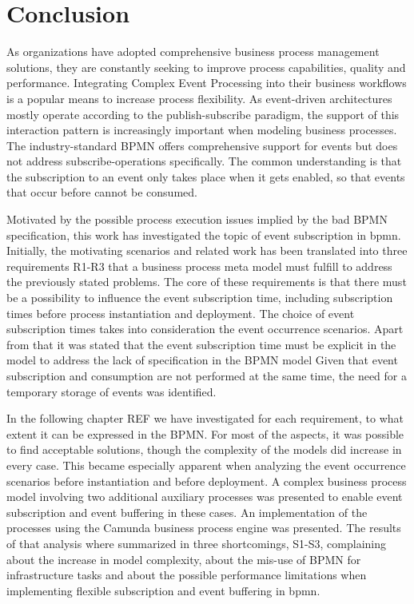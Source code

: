 \chapter{Conclusion}\label{ch:conclusion}

As organizations have adopted comprehensive business process management solutions, they are constantly seeking to improve process capabilities, quality and performance.
Integrating Complex Event Processing into their business workflows is a popular means to increase process flexibility.
As event-driven architectures mostly operate according to the publish-subscribe paradigm, the support of this interaction pattern is increasingly important when modeling business processes.
The industry-standard \acf{BPMN} offers comprehensive support for events but does not address subscribe-operations specifically.
The common understanding is that the subscription to an event only takes place when it gets enabled, so that events that occur before cannot be consumed.

Motivated by the possible process execution issues implied by the bad BPMN specification, this work has investigated the topic of event subscription in bpmn.
Initially, the motivating scenarios and related work has been translated into three requirements R1-R3 that a business process meta model must fulfill to address the previously stated problems.
The core of these requirements is that there must be a possibility to influence the event subscription time, including subscription times before process instantiation and deployment. 
The choice of event subscription times takes into consideration the event occurrence scenarios.
Apart from that it was stated that the event subscription time must be explicit in the model to address the lack of specification in the BPMN model
Given that event subscription and consumption are not performed at the same time, the need for a temporary storage of events was identified.

In the following chapter REF we have investigated for each requirement, to what extent it can be expressed in the BPMN.
For most of the aspects, it was possible to find acceptable solutions, though the complexity of the models did increase in every case.
This became especially apparent when analyzing the event occurrence scenarios before instantiation and before deployment. A complex business process model involving two additional auxiliary processes was presented to enable event subscription and event buffering in these cases.
An implementation of the processes using the Camunda business process engine was presented.
The results of that analysis where summarized in three shortcomings, S1-S3, complaining about the increase in model complexity, about the mis-use of BPMN for infrastructure tasks and about the possible performance limitations when implementing flexible subscription and event buffering in bpmn.

